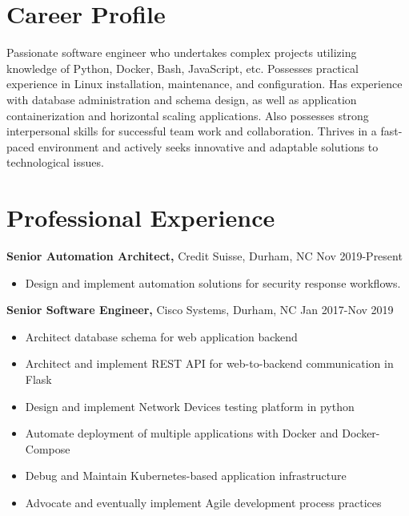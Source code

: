 \documentclass{res}
\begin{document}
 
 
\address{{\bf Present Address} \\ 9210 Bothwell St. Apt. 103 \\ Raleigh, NC 27617  \\
        (336) 681-7224 }
\address{{\bf Permanent Address} \\ 114 East Keeling Rd \\ Greensboro, NC 27410}
 
\begin{resume} 

\noindent\makebox[5.5in]{\rule{6.5in}{0.4pt}}


\section{Career Profile} 
  Passionate software engineer who undertakes complex projects utilizing knowledge of Python, Docker, Bash, JavaScript, etc. Possesses practical experience in Linux installation, maintenance, and configuration. Has experience with database administration and schema design, as well as application containerization and horizontal scaling applications. Also possesses strong interpersonal skills for successful team work and collaboration. Thrives in a fast-paced environment and actively seeks innovative and adaptable solutions to technological issues.
\section{Professional Experience}
  {\bf Senior Automation Architect,} Credit Suisse, Durham, NC \hfill Nov 2019-Present
    \begin{itemize} \itemsep -2pt
      \item Design and implement automation solutions for security response workflows. 
    \end{itemize}

  {\bf Senior Software Engineer,} Cisco Systems, Durham, NC \hfill Jan 2017-Nov 2019
    \begin{itemize} \itemsep -2pt
      \item Architect database schema for web application backend
      \item Architect and implement REST API for web-to-backend communication in Flask
      \item Design and implement Network Devices testing platform in python
      \item Automate deployment of multiple applications with Docker and Docker-Compose
      \item Debug and Maintain Kubernetes-based application infrastructure
      \item Advocate and eventually implement Agile development process practices
    \end{itemize}


\end{resume}
\end{document}
